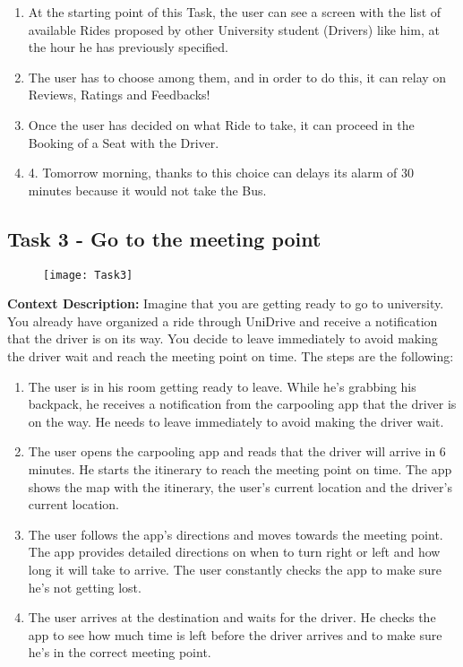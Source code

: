 \documentclass{article}
\begin{document}
\begin{enumerate}
    \item At the starting point of this Task, the user can see a screen with the list of available Rides proposed by other University student (Drivers) like him, at the hour he has previously specified. 
    \item The user has to choose among them, and in order to do this, it can relay on Reviews, Ratings and Feedbacks! 
    \item Once the user has decided on what Ride to take, it can proceed in the Booking of a Seat with the Driver.
    \item 4. Tomorrow morning, thanks to this choice can delays its alarm of 30 minutes because it would not take the Bus. 
\end{enumerate}
\newpage

\subsection{Task 3 - Go to the meeting point}

\begin{figure}[htbp]
  \centering
     \texttt{[image: Task3]}
\end{figure}

\textbf{Context Description:} Imagine that you are getting ready to go to university. You already have  organized a ride through UniDrive and receive a notification that the driver is on its way. You decide to leave immediately to avoid making the driver wait and reach the meeting point on time. The steps are the following:

\begin{enumerate}
    \item The user is in his room getting ready to leave. While he’s grabbing his backpack, he receives a notification from the carpooling app that the driver is on the way. He needs to leave immediately to avoid making the driver wait.
    \item The user opens the carpooling app and reads that the driver will arrive in 6 minutes. He starts the itinerary to reach the meeting point on time. The app shows the map with the itinerary, the user's current location and the driver’s current location.
    \item The user follows the app's directions and moves towards the meeting point. The app provides detailed directions on when to turn right or left and how long it will take to arrive. The user constantly checks the app to make sure he's not getting lost.
    \item The user arrives at the destination and waits for the driver. He checks the app to see how much time is left before the driver arrives and to make sure he's in the correct meeting point. 
\end{enumerate}
\end{document}
